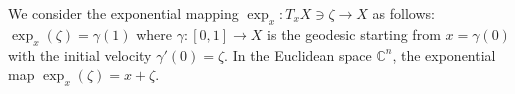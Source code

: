 \documentclass[a4paper,11pt]{amsart}
\numberwithin{equation}{section}
\theoremstyle{definition}
\newtheorem{definition}[theorem]{Definition}
\newcommand{\exph}{{\rm exph}}
\begin{document}
   We consider the exponential mapping $ \exp_x: T_x X\ni \zeta\to X$ as follows: $\exp_x(\zeta)=\gamma(1)$ where $\gamma:[0,1]\to X$ is the geodesic starting from $x=\gamma(0)$ with the initial velocity  $\gamma'(0)=\zeta$. In the Euclidean space $\mathbb{C}^n$, the exponential map $\exp_x(\zeta)=x+\zeta$. 


\end{document}
